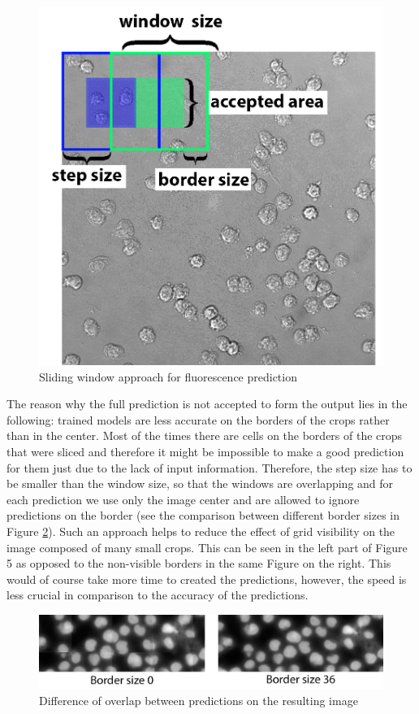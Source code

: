 \begin{figure}[H]
	\begin{center}
		\includegraphics[width=0.3\linewidth]{bilder/sliding-window.png}
		\caption{Sliding window approach for fluorescence prediction}\label{fig:sliding-window}
	\end{center}
\end{figure}
The reason why the full prediction is not accepted to form the output lies in the following: trained models are less accurate on the borders of the crops rather than in the center. Most of the times there are cells on the borders of the crops that were sliced and therefore it might be impossible to make a good prediction for them just due to the lack of input information. Therefore, the step size has to be smaller than the window size, so that the windows are overlapping and for each prediction we use only the image center and are allowed to ignore predictions on the border (see the comparison between different border sizes in Figure \ref{fig:crops-combination}). Such an approach helps to reduce the effect of grid visibility on the image composed of many small crops. This can be seen in the left part of Figure 5 as opposed to the non-visible borders in the same Figure on the right. This would of course take more time to created the predictions, however, the speed is less crucial in comparison to the accuracy of the predictions.

\begin{figure}[htb]
	\begin{center}
		\includegraphics[width=\linewidth]{bilder/crops_combination/crops-combination.png}
		\caption{Difference of overlap between predictions on the resulting image}\label{fig:crops-combination}
	\end{center}
\end{figure}